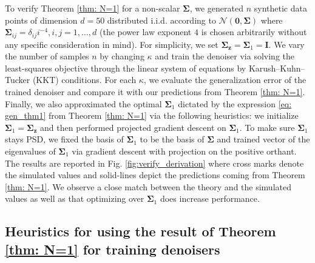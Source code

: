 \documentclass[final]{l4dc2026}
\newcommand{\bSigma}{\bm{\Sigma}}
\newcommand{\bI}{\mathbf{I}}
\newcommand{\bz}{\mathbf{z}}
\newcommand{\calN}{\mathcal{N}}
\newcommand{\bzero}{\mathbf{0}}
\begin{document}
 To verify Theorem \ref{thm: N=1} for a non-scalar $\bSigma$, we generated $n$ synthetic data points of dimension $d = 50$ distributed i.i.d. according to $\calN(\bzero, \bSigma)$ where $\bSigma_{ij} = \delta_{ij}i^{-4}, i, j = 1,\dots,d$ (the power law exponent $4$ is chosen arbitrarily without any specific consideration in mind). For simplicity, we set $\bSigma_{\bz} = \bSigma_1 = \bI$. We vary the number of samples $n$ by changing $\kappa$ and train the denoiser via solving the least-squares objective through the linear system of equations by Karush–Kuhn–Tucker (KKT) conditions. For each $\kappa$, we evaluate the generalization error of the trained denoiser and compare it with our predictions from Theorem \ref{thm: N=1}. Finally, we also approximated the optimal $\bSigma_1$ dictated by the expression \eqref{eq: gen_thm1} from Theorem \ref{thm: N=1} via the following heuristics: we initialize $\bSigma_1 = \bSigma_{\bz}$ and then performed projected gradient descent on $\bSigma_1$. To make sure $\bSigma_1$ stays PSD, we fixed the basis of $\bSigma_1$ to be the basis of $\bSigma$ and trained vector of the eigenvalues  of $\bSigma_1$ via gradient descent with projection on the positive orthant.  The results are reported in Fig. \ref{fig:verify_derivation} where cross marks denote the simulated values and solid-lines depict the  predictions coming from Theorem \ref{thm: N=1}. We observe a close match between the theory and the simulated values as well as that optimizing over $\bSigma_1$ does increase performance. 

\subsection{Heuristics for using the result of Theorem \ref{thm: N=1} for training denoisers}
\end{document}
